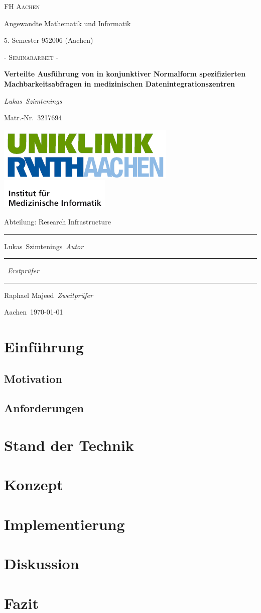 \documentclass[11pt,a4paper]{scrartcl}
\title{\titel}
\author{\vorname\ \nachname}
\date{\today{}, \location}
\newcommand{\vorname}{Lukas}
\newcommand{\nachname}{Szimtenings}
\newcommand{\matr}{Matr.-Nr.\ 3217694}
\newcommand{\uni}{FH Aachen}
\newcommand{\studiengang}{Angewandte Mathematik und Informatik}
\newcommand{\modul}{5. Semester 952006 (Aachen)}
\newcommand{\erstpruefer}{}
\newcommand{\zweitpruefer}{Raphael Majeed}
\newcommand{\subtitel}{ Verteilte Ausführung von in konjunktiver Normalform spezifizierten Machbarkeitsabfragen in medizinischen Datenintegrationszentren }
\newcommand{\titel}{- Seminararbeit -}
\newcommand{\location}{Aachen}
\newcommand{\abteilung}{Abteilung: Research Infrastructure}
\newcommand{\uklogo}{
	\includegraphics[scale=0.5]{logo-uniklinik-rwth-aachen}
	\includegraphics[scale=0.6]{imi_sublogo}
}
\begin{document}
	\begin{titlepage}
		\centering
		{\scshape\LARGE \uni \par \studiengang \par \modul \par}
		\vspace{1cm}
		{\scshape\Large \titel \par}
		\vspace{1.5cm}
		{\bfseries \huge \subtitel \par}
		\vspace{2cm}
		{\itshape \Large \vorname\ \nachname\par \matr \par}
		\vfill
		\begin{center}
			\uklogo
			\par
			\abteilung
			
		\end{center}
		\par\vfill
		\parbox{3cm}{\centering	\hrule \strut \centering \footnotesize {\vorname\ \nachname}\ \textit{Autor}}
		\hfill 
		\parbox{5cm}{\hrule \strut \centering \footnotesize \erstpruefer\ \textit{Erstprüfer}}
		\hfill
		\parbox{4cm}{\hrule \strut \centering \footnotesize \zweitpruefer\ \textit{Zweitprüfer}}
		\vfill
		{\large\location\ \today\par}
	\end{titlepage}
	
	\tableofcontents
	\newpage
 	
 	\section{Einführung}\label{sec:introduction}
	\subsection{Motivation}\label{subsec:motivation}
	\subsection{Anforderungen}\label{subsec:anforderungen}
	\section{Stand der Technik}\label{sec:state-of-the-art}
	\section{Konzept}\label{sec:konzept}
	\section{Implementierung}\label{sec:implementierung}
	\section{Diskussion}\label{sec:diskussion}
	\section{Fazit}\label{sec:fazit}

	\newpage
 	
 	\listoffigures
\end{document}
